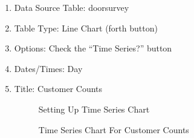 \begin{enumerate}
  \item Data Source Table: doorsurvey
  \item Table Type: Line Chart (forth button)
  \item Options: Check the ``Time Series?'' button
  \item Dates/Times: Day
  \item Title: Customer Counts
  
  \begin{figure}[H]
    \begin{center}
      \caption{Setting Up Time Series Chart}
    \end{center}
  \end{figure}
  
  \begin{figure}[H]
    \begin{center}
      \caption{Time Series Chart For Customer Counts}
    \end{center}
  \end{figure}
\end{enumerate}

